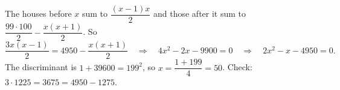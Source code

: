 The houses before $x$ sum to $\dfrac{(x-1)x}{2}$ and those after it sum to $\dfrac{99\cdot100}{2}-\dfrac{x(x+1)}{2}$. So
\[
\dfrac{3x(x-1)}{2}=4950-\dfrac{x(x+1)}{2}\quad\Longrightarrow\quad4x^2-2x-9900=0\quad\Longrightarrow\quad2x^2-x-4950=0 .
\]
The discriminant is $1+39600=199^2$, so $x=\dfrac{1+199}{4}=\boxed{50}$. Check: $3\cdot1225=3675=4950-1275$.
